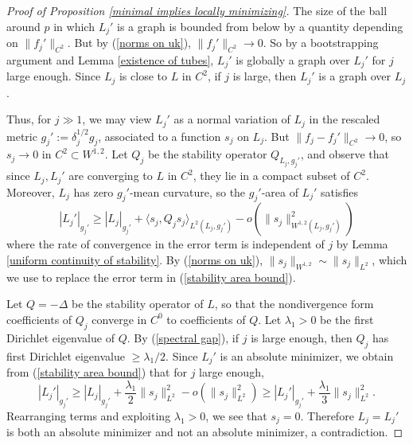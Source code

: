 \documentclass[reqno,11pt]{amsart}
\theoremstyle{definition}
\numberwithin{equation}{section}
\begin{document}
\begin{proof}[Proof of Proposition \ref{minimal implies locally minimizing}]
The size of the ball around $p$ in which $L_j'$ is a graph is bounded from below by a quantity depending on $\|f_j'\|_{C^2}$.
But by (\ref{norms on uk}), $\|f_j'\|_{C^2} \to 0$.
So by a bootstrapping argument and Lemma \ref{existence of tubes}, $L_j'$ is globally a graph over $L_j'$ for $j$ large enough.
Since $L_j$ is close to $L$ in $C^2$, if $j$ is large, then $L_j'$ is a graph over $L_j$.

Thus, for $j \gg 1$, we may view $L_j'$ as a normal variation of $L_j$ in the rescaled metric $g_j' := \delta_j^{1/2} g_j$, associated to a function $s_j$ on $L_j$.
But $\|f_j - f_j'\|_{C^2} \to 0$, so $s_j \to 0$ in $C^2 \subset W^{1, 2}$.
Let $Q_j$ be the stability operator $Q_{L_j, g_j'}$, and observe that since $L_j, L_j'$ are converging to $L$ in $C^2$, they lie in a compact subset of $C^2$. 
Moreover, $L_j$ has zero $g_j'$-mean curvature, so the $g_j'$-area of $L_j'$ satisfies
\begin{equation}\label{stability area bound}
|L_j'|_{g_j'} \geq |L_j|_{g_j'} + \langle s_j, Q_j s_j\rangle_{L^2(L_j, g_j')} - o(\|s_j\|_{W^{1, 2}(L_j, g_j')}^2)
\end{equation}
where the rate of convergence in the error term is independent of $j$ by Lemma \ref{uniform continuity of stability}.
By (\ref{norms on uk}), $\|s_j\|_{W^{1, 2}} \sim \|s_j\|_{L^2}$, which we use to replace the error term in (\ref{stability area bound}).

Let $Q = -\Delta$ be the stability operator of $L$, so that the nondivergence form coefficients of $Q_j$ converge in $C^0$ to coefficients of $Q$.
Let $\lambda_1 > 0$ be the first Dirichlet eigenvalue of $Q$.
By (\ref{spectral gap}), if $j$ is large enough, then $Q_j$ has first Dirichlet eigenvalue $\geq \lambda_1/2$.
Since $L_j'$ is an absolute minimizer, we obtain from (\ref{stability area bound}) that for $j$ large enough,
$$|L_j'|_{g_j'} \geq |L_j|_{g_j'} + \frac{\lambda_1}{2} \|s_j\|_{L^2}^2 - o(\|s_j\|_{L^2}^2) \geq |L_j'|_{g_j'} + \frac{\lambda_1}{3} \|s_j\|_{L^2}^2.$$
Rearranging terms and exploiting $\lambda_1 > 0$, we see that $s_j = 0$.
Therefore $L_j = L_j'$ is both an absolute minimizer and not an absolute minimizer, a contradiction.
\end{proof}

\printbibliography
\end{document}
